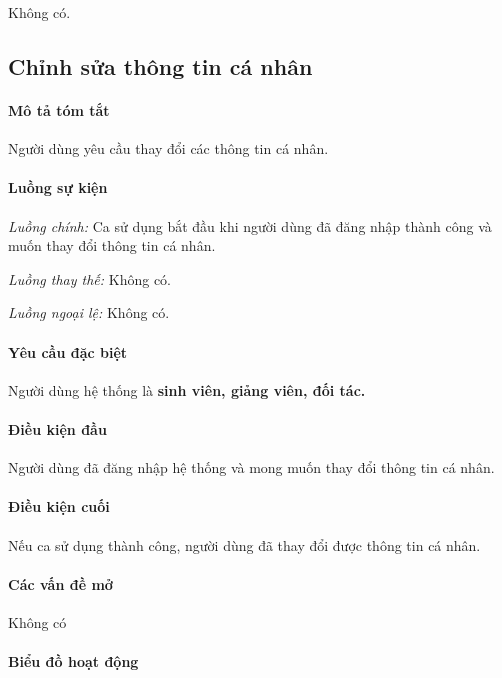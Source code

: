 \documentclass[./../main.tex]{subfiles}
\begin{document}
Không có.

\subsection{Chỉnh sửa thông tin cá nhân}

\paragraph*{Mô tả tóm tắt}

Người dùng yêu cầu thay đổi các thông tin cá nhân.

\paragraph*{Luồng sự kiện}

\emph{Luồng chính:} Ca sử dụng bắt đầu khi người dùng đã đăng nhập thành
công và muốn thay đổi thông tin cá nhân.

\emph{Luồng thay thế:} Không có.

\emph{Luồng ngoại lệ:} Không có.

\paragraph*{Yêu cầu đặc biệt}

Người dùng hệ thống là \textbf{sinh viên, giảng viên, đối tác.}

\paragraph*{Điều kiện đầu}

Người dùng đã đăng nhập hệ thống và mong muốn thay đổi thông tin cá
nhân.

\paragraph*{Điều kiện cuối}

Nếu ca sử dụng thành công, người dùng đã thay đổi được thông tin cá
nhân.

\paragraph*{Các vấn đề mở}

Không có

\paragraph*{Biểu đồ hoạt động}
\end{document}
